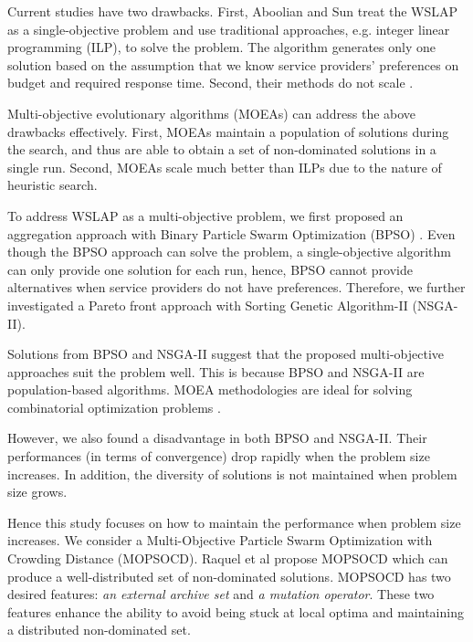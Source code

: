 \documentclass[10pt,journal,compsoc]{IEEEtran}
\begin{document}
Current studies have two drawbacks. First, Aboolian and Sun \cite{Aboolian, Sun} treat the WSLAP as a single-objective problem and use traditional approaches, e.g. integer linear programming (ILP), to solve the problem. The algorithm generates only one solution based on the assumption that we know service providers' preferences on budget and required response time. Second, their methods do not scale \cite{klotz2013practical}. 

Multi-objective evolutionary algorithms (MOEAs) can address the above drawbacks effectively. First, MOEAs maintain a population of solutions during the search, and thus are able to obtain a set of non-dominated solutions in a single run. Second, MOEAs scale much better than ILPs due to the nature of heuristic search.

To address WSLAP as a multi-objective problem, we first proposed an aggregation approach with Binary Particle Swarm Optimization (BPSO) \cite{Tan2016a}. Even though the BPSO approach can solve the problem, a single-objective algorithm can only provide one solution for each run, hence, BPSO cannot provide alternatives when service providers do not have preferences. Therefore, we further investigated a Pareto front approach \cite{Tan2016} with Sorting Genetic Algorithm-II (NSGA-II).

Solutions from BPSO and NSGA-II suggest that the proposed multi-objective approaches suit the problem well. This is because BPSO and NSGA-II are population-based algorithms. MOEA methodologies are ideal \cite{key:article} for solving combinatorial optimization problems \cite{tuladhar2016multi,senouci2016static}.

However, we also found a disadvantage in both BPSO and NSGA-II. Their performances (in terms of convergence) drop rapidly when the problem size increases. In addition, the diversity of solutions is not maintained when problem size grows. 

Hence this study focuses on how to maintain the performance when problem size increases. We consider a Multi-Objective Particle Swarm Optimization with Crowding Distance (MOPSOCD). Raquel et al \cite{Raquel} propose MOPSOCD which can produce a well-distributed set of non-dominated solutions. MOPSOCD has two desired features: \emph{an external archive set} and \emph{a mutation operator}. These two features enhance the ability to avoid being stuck at local optima and maintaining a distributed non-dominated set. 

\end{document}

